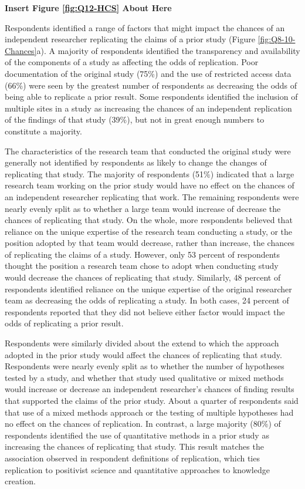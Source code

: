 \documentclass[]{interact}
\theoremstyle{plain}%
\theoremstyle{definition}
\theoremstyle{remark}
\begin{document}
\begin{center}
\textbf{Insert Figure \ref{fig:Q12-HCS} About Here}
\end{center}

Respondents identified a range of factors that might impact the chances of an independent researcher replicating the claims of a prior study (Figure \ref{fig:Q8-10-Chances}a).
A majority of respondents identified the transparency and availability of the components of a study as affecting the odds of replication. 
Poor documentation of the original study (75\%) and the use of restricted access data (66\%) were seen by the greatest number of respondents as decreasing the odds of being able to replicate a prior result. 
Some respondents identified the inclusion of multiple sites in a study as increasing the chances of an independent replication of the findings of that study (39\%), but not in great enough numbers to constitute a majority. 

The characteristics of the research team that conducted the original study were generally not identified by respondents as likely to change the changes of replicating that study. 
The majority of respondents (51\%) indicated that a large research team working on the prior study would have no effect on the chances of an independent researcher replicating that work. 
The remaining respondents were nearly evenly split as to whether a large team would increase of decrease the chances of replicating that study. 
On the whole, more respondents believed that reliance on the unique expertise of the research team conducting a study, or the position adopted by that team would decrease, rather than increase, the chances of replicating the claims of a study.
However, only 53 percent of respondents thought the position a research team chose to adopt when conducting study would decrease the chances of replicating that study. 
Similarly, 48 percent of respondents identified reliance on the unique expertise of the original researcher team as decreasing the odds of replicating a study. 
In both cases, 24 percent of respondents reported that they did not believe either factor would impact the odds of replicating a prior result.

Respondents were similarly divided about the extend to which the approach adopted in the prior study would affect the chances of replicating that study. 
Respondents were nearly evenly split as to whether the number of hypotheses tested by a study, and whether that study used qualitative or mixed methods would increase or decrease an independent researcher's chances of finding results that supported the claims of the prior study.
About a quarter of respondents said that use of a mixed methods approach or the testing of multiple hypotheses had no effect on the chances of replication.
In contrast, a large majority (80\%) of respondents identified the use of quantitative methods in a prior study as increasing the chances of replicating that study. 
This result matches the association observed in respondent definitions of replication, which ties replication to positivist science and quantitative approaches to knowledge creation.   
\end{document}
